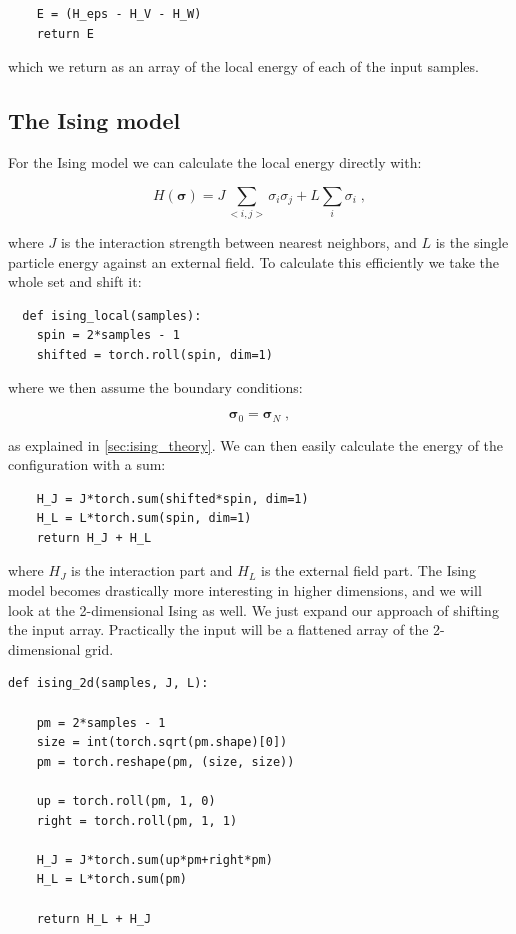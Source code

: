 \begin{verbatim}
    E = (H_eps - H_V - H_W)
    return E
\end{verbatim}

which we return as an array of the local energy of each of the input samples.

\subsection{The Ising model}

For the Ising model we can calculate the local energy directly with:

\begin{equation}
  H(\boldsymbol{\sigma}) = J\sum_{<i,j>}\sigma_i\sigma_j + L \sum_i \sigma_i \; ,
  \label{eq:imp_hamil_ising}
\end{equation}

where $J$ is the interaction strength between nearest neighbors, and $L$ is the single particle energy against an external field. To calculate this efficiently we take the whole set and shift it:

\begin{verbatim}
  def ising_local(samples):
    spin = 2*samples - 1
    shifted = torch.roll(spin, dim=1)
\end{verbatim}

where we then assume the boundary conditions:

\begin{equation}
  \mathbf{\sigma}_0 = \mathbf{\sigma}_N \; ,
  \label{eq:ising_boundary_imp}
\end{equation}

as explained in \ref{sec:ising_theory}. We can then easily calculate the energy of the configuration with a sum:

\begin{verbatim}
    H_J = J*torch.sum(shifted*spin, dim=1)
    H_L = L*torch.sum(spin, dim=1)
    return H_J + H_L
\end{verbatim}

where $H_J$ is the interaction part and $H_L$ is the external field part. The Ising model becomes drastically more interesting in higher dimensions, and we will look at the 2-dimensional Ising as well. We just expand our approach of shifting the input array. Practically the input will be a flattened array of the 2-dimensional grid.

\begin{verbatim}
def ising_2d(samples, J, L):
    
    pm = 2*samples - 1
    size = int(torch.sqrt(pm.shape)[0])
    pm = torch.reshape(pm, (size, size))

    up = torch.roll(pm, 1, 0)
    right = torch.roll(pm, 1, 1)

    H_J = J*torch.sum(up*pm+right*pm)
    H_L = L*torch.sum(pm)

    return H_L + H_J
\end{verbatim}


